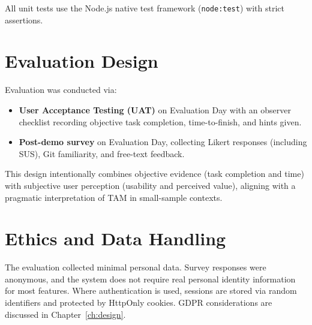 All unit tests use the Node.js native test framework (\texttt{node:test}) with
strict assertions.

\section{Evaluation Design}
Evaluation was conducted via:
\begin{itemize}
  \item \textbf{User Acceptance Testing (UAT)} on Evaluation Day with an observer
        checklist recording objective task completion, time-to-finish, and hints
        given.
  \item \textbf{Post-demo survey} on Evaluation Day, collecting Likert responses
        (including SUS), Git familiarity, and free-text feedback.
\end{itemize}

This design intentionally combines objective evidence (task completion and time) with subjective user perception (usability and perceived value), aligning with a pragmatic interpretation of TAM in small-sample contexts.

\section{Ethics and Data Handling}
The evaluation collected minimal personal data. Survey responses were anonymous,
and the system does not require real personal identity information for most
features. Where authentication is used, sessions are stored via random
identifiers and protected by HttpOnly cookies. GDPR considerations are discussed
in Chapter~\ref{ch:design}.
